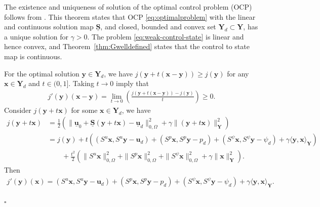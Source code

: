 \documentclass[smallextended]{svjour3}
\renewenvironment{proof}{\noindent{\it Proof.}}{\hfill$\square$}
\numberwithin{equation}{section}
\numberwithin{figure}{section}
\numberwithin{table}{section}
\newcommand{\buS}{\underline{\boldsymbol{S}}}
\newcommand\buu{\underline{\boldsymbol{u}}}
\newcommand\bx{\boldsymbol{x}}
\newcommand\by{\boldsymbol{y}}
\newcommand\bu{\boldsymbol{u}}
\newcommand{\bYd}{\boldsymbol{Y}_d}
\newcommand{\bY}{\boldsymbol{Y}}
\begin{document}
	\begin{proof}
    The existence and uniqueness of solution of the optimal control problem (OCP) follows from \cite[Theorem~$2.14$]{troltzsch10}. This theorem states that OCP \eqref{eq:optimalproblem} with the linear and continuous solution map $\buS$, and closed, bounded and convex set $\bYd \subset \bY$, has a unique solution for $\gamma>0$.
    The problem \eqref{eq:weak-control-state} is linear and hence convex, and Theorem~\ref{thm:Gwelldefined} states that the control to state map is continuous.
    
	\smallskip
    
    For the optimal solution $\by \in \bYd$, we have $j(\by + t (\bx - \by)) \ge j(\by)$ for any $\bx \in \bYd$ and $t \in (0,1]$. Taking $t \to 0$ imply that 
			\begin{align*}
				j'(\by) (\bx - \by) = \lim_{t \to 0} \left(\frac{j(\by+t (\bx - \by)) - j(\by)}{t} \right) \ge 0.
			\end{align*}
			Consider $j(\by+t \bx)$ for some $\bx \in \bYd$, we have
			\begin{align*}
				j(\by+t \bx) & = \frac{1}{2} \left( \| \buu_0 + \buS (\by+t \bx)  - \buu_d \|_{0, \Omega}^2 + \gamma \| (\by+t \bx) \|_{\bY}^2 \right) \\
				& = j(\by) + t \left( (S^u \bx, S^u \by - \bu_d) + (S^p \bx, S^p \by - p_d)  + (S^\psi \bx, S^\psi \by - \psi_d) + \gamma  \langle \by, \bx \rangle_{\bY} \right) \\
				& \qquad + \frac{t^2}{2} \left(  \| S^u \bx \|_{0, \Omega}^2 + \| S^p  \bx  \|_{0, \Omega}^2 +  \| S^\psi \bx \|_{0, \Omega}^2 + \gamma \| \bx \|_{\bY}^2 \right).
			\end{align*}
			Then
			\begin{align} \label{eq:optimalcondn}
				j'(\by)(\bx) = (S^u \bx, S^u \by - \bu_d) + (S^p \bx, S^p \by - p_d)  + (S^\psi \bx, S^\psi \by - \psi_d) + \gamma \langle \by, \bx \rangle_{\bY} .
			\end{align}
			

\end{proof}
\end{document}

